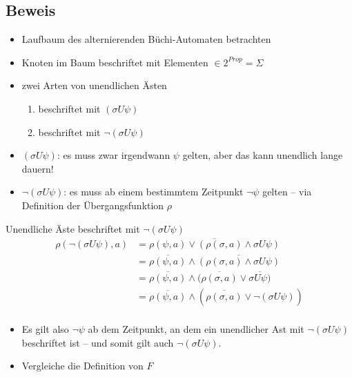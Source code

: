 \subsection{Beweis}
\begin{frame}{\insertsubsection}
\begin{itemize}
    \item Laufbaum des alternierenden Büchi-Automaten betrachten
    \item Knoten im Baum beschriftet mit Elementen $\in 2^{Prop} = \Sigma$
    \item zwei Arten von unendlichen Ästen
    \begin{enumerate}
        \item beschriftet mit $(\sigma U\psi)$
        \item beschriftet mit $\lnot(\sigma U\psi)$
    \end{enumerate}
    \item $(\sigma U\psi)$: es muss zwar irgendwann $\psi$ gelten, aber das kann unendlich lange dauern!
    \item $\lnot(\sigma U\psi)$: es muss ab einem bestimmtem Zeitpunkt $\lnot\psi$ gelten -- via Definition der Übergangsfunktion $\rho$
\end{itemize}
\end{frame}

\begin{frame}{\insertsubsection}
    \begin{block}{Unendliche Äste beschriftet mit $\lnot(\sigma U\psi)$}
        \begin{equation*}
        \begin{split}
            \rho(\lnot(\sigma U\psi), a) &= \overline{\rho(\psi, a) \lor (\rho(\sigma, a) \land \sigma U\psi)}\\
            &= \overline{\rho(\psi, a)} \land \overline{(\rho(\sigma, a) \land \sigma U\psi)}\\
            &= \overline{\rho(\psi, a)} \land (\overline{\rho(\sigma, a)} \lor \overline{\sigma U\psi)}\\
            &= \overline{\rho(\psi, a)} \land (\overline{\rho(\sigma, a)} \lor \lnot(\sigma U\psi))\\
        \end{split}
        \end{equation*}
    \end{block}

    \begin{itemize}
    \setlength\itemsep{1em}
        \item Es gilt also $\lnot\psi$ ab dem Zeitpunkt, an dem ein unendlicher Ast mit $\lnot(\sigma U\psi)$ beschriftet ist -- und somit gilt auch $\lnot(\sigma U\psi)$.
        \item Vergleiche die Definition von $F$ 
    \end{itemize}
\end{frame}

